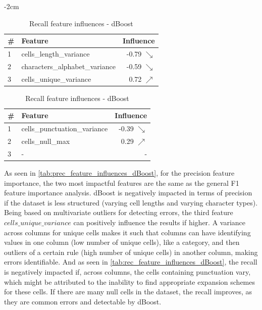 \begin{table}[H]
	\centering
	\addtolength{\leftskip} {-2cm}
	\addtolength{\rightskip}{-2cm}
	\captionsetup[subtable]{position = below}
	\captionsetup[table]{position=top}
	\caption{Top feature influences - dBoost}
	\label{tab:feature_influences_dBoost}
		\begin{subtable}{0.5\linewidth}
		\centering
		\begin{tabular}{llr}
\toprule
 \# &                         Feature &         Influence \\
\midrule
 1 &         cells\_length\_variance &  -0.79 $\searrow$ \\
 2 &  characters\_alphabet\_variance &  -0.59 $\searrow$ \\
 3 &         cells\_unique\_variance &   0.72 $\nearrow$ \\
\bottomrule
\end{tabular}
		\caption{Precision feature influences - dBoost}
		\label{tab:prec_feature_influences_dBoost}
	\end{subtable}
	\hspace*{4em}
	\begin{subtable}{0.5\linewidth}
		\centering
		\begin{tabular}{llr}
\toprule
 \# &                       Feature &         Influence \\
\midrule
 1 &  cells\_punctuation\_variance &  -0.39 $\searrow$ \\
 2 &              cells\_null\_max &   0.29 $\nearrow$ \\
 3 &         - &                 - \\
\bottomrule
\end{tabular}
		\caption{Recall feature influences - dBoost}
		\label{tab:rec_feature_influences_dBoost}
	\end{subtable}%
\end{table}

As seen in \autoref{tab:prec_feature_influences_dBoost}, for the precision feature importance, the two most impactful features are the same as the general F1 feature importance analysis. dBoost is negatively impacted in terms of precision if the dataset is less structured (varying cell lengths and varying character types). Being based on multivariate outliers for detecting errors, the third feature $cells\_unique\_variance$ can positively influence the results if higher. A variance across columns for unique cells makes it such that columns can have identifying values in one column (low number of unique cells), like a category, and then outliers of a certain rule (high number of unique cells) in another column, making errors identifiable. 
And as seen in \autoref{tab:rec_feature_influences_dBoost}, the recall is negatively impacted if, across columns, the cells containing punctuation vary, which might be attributed to the inability to find appropriate expansion schemes for these cells. If there are many null cells in the dataset, the recall improves, as they are common errors and detectable by dBoost.


